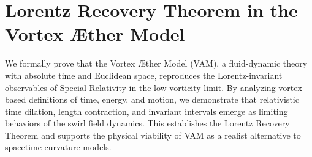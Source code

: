 \documentclass[preprint]{revtex4-2}
\newcommand{\paperdoi}{10.5281/zenodo.15566336}
\begin{document}

%
%
%
%
%
%
%
%
%
%
    \section{Lorentz Recovery Theorem in the Vortex Æther Model}
        We formally prove that the Vortex Æther Model (VAM), a fluid-dynamic theory with absolute time and Euclidean space, reproduces the Lorentz-invariant observables of Special Relativity in the low-vorticity limit. By analyzing vortex-based definitions of time, energy, and motion, we demonstrate that relativistic time dilation, length contraction, and invariant intervals emerge as limiting behaviors of the swirl field dynamics. This establishes the Lorentz Recovery Theorem and supports the physical viability of VAM as a realist alternative to spacetime curvature models.
\end{document}
